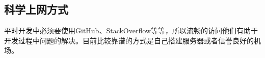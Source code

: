 \documentclass[../../../dolphin-book-2023.tex]{subfiles}
\begin{document}
\subsection{科学上网方式}

平时开发中必须要使用GitHub、StackOverflow等等，所以流畅的访问他们有助于开发过程中问题的解决。目前比较靠谱的方式是自己搭建服务器或者信誉良好的机场。
\end{document}
